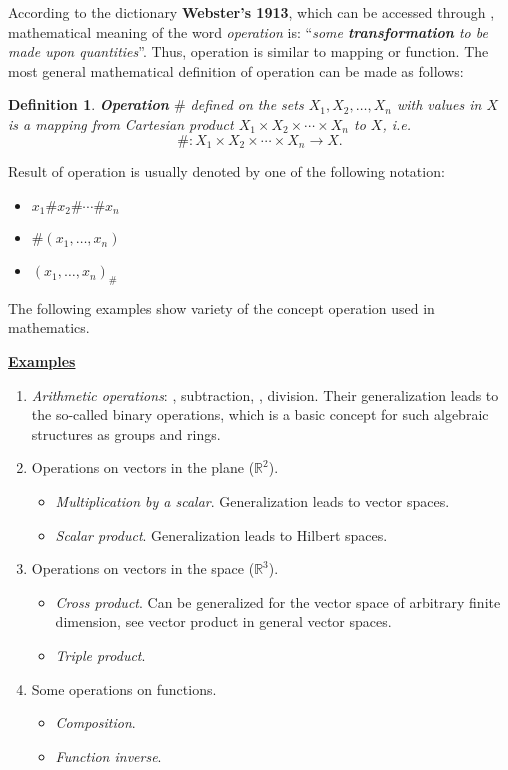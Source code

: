 \documentclass[12pt]{article}
\newtheorem{dfn}{Definition}
\begin{document}
According to the dictionary \textbf{Webster's 1913}, which can be accessed through
, mathematical
meaning of the word \textit{operation} is: ``\textit{some \textbf{transformation} to be
made upon quantities}''. Thus, operation is similar to mapping or function. The most
general mathematical definition of operation can be made as follows:
%
\begin{dfn}
    \textbf{Operation} $\#$ defined on the sets $X_1,X_2,\ldots,X_n$ with values in $X$
    is a mapping from Cartesian product $X_1\times X_2\times
\cdots\times X_n$ to $X$, i.e.
    $$
        \# \colon X_1\times X_2\times\cdots\times X_n \longrightarrow X.
    $$
\end{dfn}
%
\noindent
Result of operation is usually denoted by one of the following notation:
\begin{itemize}
\item $x_1 \# x_2 \# \cdots \# x_n$
\item $\#(x_1,\ldots,x_n)$
\item $(x_1,\ldots,x_n)_\#$
\end{itemize}
%
The following examples show variety of the concept operation used in mathematics.

\vspace{0.5cm}
\noindent
\underline{\textbf{Examples}}
\begin{enumerate}
\item \textit{Arithmetic operations}: , subtraction, , division.
    Their generalization leads to the so-called binary operations, which is a basic concept
    for such algebraic structures as groups and rings.

\item Operations on vectors in the plane ($\mathbb{R}^2$).
    \begin{itemize}
    \item \textit{Multiplication by a scalar}. Generalization leads to vector spaces.
    \item \textit{Scalar product}. Generalization leads to Hilbert spaces.
    \end{itemize}

\item Operations on vectors in the space ($\mathbb{R}^3$).
    \begin{itemize}
    \item \textit{Cross product}. Can be generalized for the vector space of arbitrary
            finite dimension, see vector product in general vector spaces.
    \item \textit{Triple product}.
    \end{itemize}

\item Some operations on functions.
    \begin{itemize}
    \item \textit{Composition}.
    \item \textit{Function inverse}.
    \end{itemize}
\end{enumerate}
\vspace{0.5cm}
\end{document}
